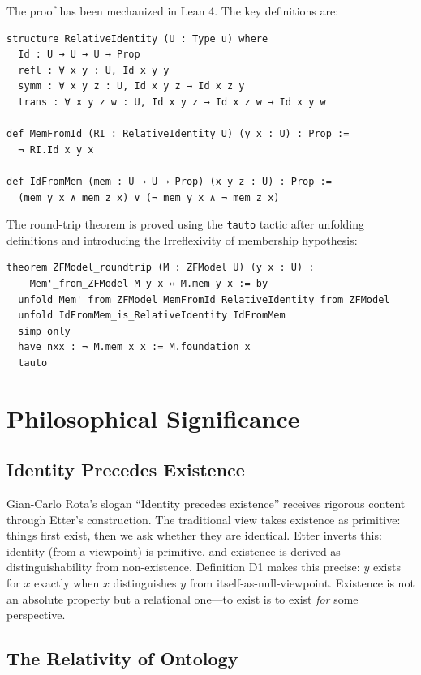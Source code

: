 \documentclass[11pt, a4paper]{article}
\theoremstyle{remark}
\begin{document}
The proof has been mechanized in Lean 4. The key definitions are:

\begin{verbatim}
structure RelativeIdentity (U : Type u) where
  Id : U → U → U → Prop
  refl : ∀ x y : U, Id x y y
  symm : ∀ x y z : U, Id x y z → Id x z y
  trans : ∀ x y z w : U, Id x y z → Id x z w → Id x y w

def MemFromId (RI : RelativeIdentity U) (y x : U) : Prop :=
  ¬ RI.Id x y x

def IdFromMem (mem : U → U → Prop) (x y z : U) : Prop :=
  (mem y x ∧ mem z x) ∨ (¬ mem y x ∧ ¬ mem z x)
\end{verbatim}

The round-trip theorem is proved using the \texttt{tauto} tactic after unfolding definitions and introducing the Irreflexivity of membership hypothesis:

\begin{verbatim}
theorem ZFModel_roundtrip (M : ZFModel U) (y x : U) :
    Mem'_from_ZFModel M y x ↔ M.mem y x := by
  unfold Mem'_from_ZFModel MemFromId RelativeIdentity_from_ZFModel
  unfold IdFromMem_is_RelativeIdentity IdFromMem
  simp only
  have nxx : ¬ M.mem x x := M.foundation x
  tauto
\end{verbatim}

\section{Philosophical Significance}

\subsection{Identity Precedes Existence}

Gian-Carlo Rota's slogan ``Identity precedes existence''\cite{rota} receives rigorous content through Etter's construction. The traditional view takes existence as primitive: things first exist, then we ask whether they are identical. Etter inverts this: identity (from a viewpoint) is primitive, and existence is derived as distinguishability from non-existence. Definition D1 makes this precise: $y$ exists for $x$ exactly when $x$ distinguishes $y$ from itself-as-null-viewpoint. Existence is not an absolute property but a relational one---to exist is to exist \emph{for} some perspective.

\subsection{The Relativity of Ontology}
\end{document}
